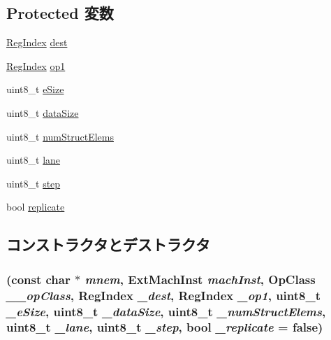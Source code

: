 \subsection*{Protected 変数}
\begin{DoxyCompactItemize}
\item 
\hyperlink{classStaticInst_a36d25e03e43fa3bb4c5482cbefe5e0fb}{RegIndex} \hyperlink{classArmISA_1_1MicroNeonMixLaneOp64_a6563276134c2f303bab0c30e83e02220}{dest}
\item 
\hyperlink{classStaticInst_a36d25e03e43fa3bb4c5482cbefe5e0fb}{RegIndex} \hyperlink{classArmISA_1_1MicroNeonMixLaneOp64_ae55982e6b9309683aef1b44249ab406f}{op1}
\item 
uint8\_\-t \hyperlink{classArmISA_1_1MicroNeonMixLaneOp64_aac129ded07ba57383c5e2540f22c94ef}{eSize}
\item 
uint8\_\-t \hyperlink{classArmISA_1_1MicroNeonMixLaneOp64_af13e629a2f79d14821c7b9246ef99e9f}{dataSize}
\item 
uint8\_\-t \hyperlink{classArmISA_1_1MicroNeonMixLaneOp64_afb0be420b537599a5b86558127502040}{numStructElems}
\item 
uint8\_\-t \hyperlink{classArmISA_1_1MicroNeonMixLaneOp64_af193aa092c273ecfcd953f986cd68f9d}{lane}
\item 
uint8\_\-t \hyperlink{classArmISA_1_1MicroNeonMixLaneOp64_a4a2eb71e89c989655301c2f2070e29b3}{step}
\item 
bool \hyperlink{classArmISA_1_1MicroNeonMixLaneOp64_a8f2b56ecc4db4f48e2c08aef78591efc}{replicate}
\end{DoxyCompactItemize}


\subsection{コンストラクタとデストラクタ}
\hypertarget{classArmISA_1_1MicroNeonMixLaneOp64_a9d9e8837f3b4b5a5c931fb6133f35b36}{
\subsubsection[{MicroNeonMixLaneOp64}]{ (const char $\ast$ {\em mnem}, \/  {\bf ExtMachInst} {\em machInst}, \/  OpClass {\em \_\-\_\-opClass}, \/  {\bf RegIndex} {\em \_\-dest}, \/  {\bf RegIndex} {\em \_\-op1}, \/  uint8\_\-t {\em \_\-eSize}, \/  uint8\_\-t {\em \_\-dataSize}, \/  uint8\_\-t {\em \_\-numStructElems}, \/  uint8\_\-t {\em \_\-lane}, \/  uint8\_\-t {\em \_\-step}, \/  bool {\em \_\-replicate} = {\ttfamily false})}}
\label{classArmISA_1_1MicroNeonMixLaneOp64_a9d9e8837f3b4b5a5c931fb6133f35b36}




